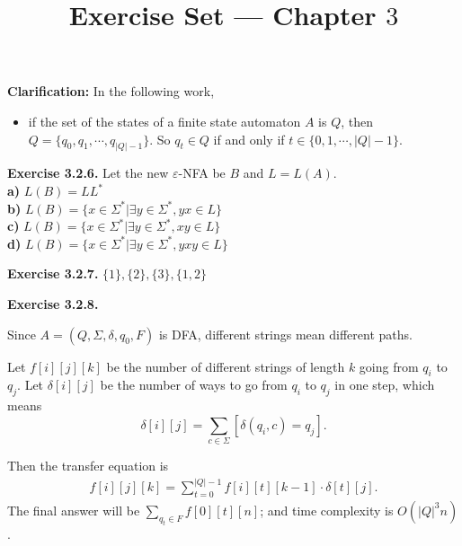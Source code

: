 \documentclass[a4paper]{article}
\title{Exercise Set --- Chapter $3$}
\date{}
\newenvironment{exercise}[1]{
	\par
	\noindent\textbf{Exercise #1.}\quad
}{
	\par
	\bigskip
}
\begin{document}
\maketitle

\noindent\textbf{Clarification:} In the following work,
\begin{itemize}
\item if the set of the states of a finite state automaton $A$ is $Q$,
then $Q=\{q_0,q_1,\cdots,q_{|Q|-1}\}$. So $q_t\in Q$ if and only if $t\in\{0,1,\cdots,|Q|-1\}$.
\end{itemize}

\begin{exercise}{3.2.6} Let the new $\varepsilon$-NFA be $B$ and $L=L(A)$.\\
    \textbf{a)} $L(B)=LL^*$\\
    \textbf{b)} $L(B)=\{x\in\Sigma^*|\exists y\in\Sigma^*, yx\in L\}$\\
    \textbf{c)} $L(B)=\{x\in\Sigma^*|\exists y\in\Sigma^*, xy\in L\}$\\
    \textbf{d)} $L(B)=\{x\in\Sigma^*|\exists y\in\Sigma^*, yxy\in L\}$
\end{exercise}

\begin{exercise}{3.2.7} $\{1\},\{2\},\{3\},\{1,2\}$\end{exercise}

\begin{exercise}{3.2.8}
    Since $A=(Q,\Sigma,\delta,q_0,F)$ is DFA,
    different strings mean different paths.\par
    Let $f[i][j][k]$ be the number of different strings of length $k$ going from $q_i$
    to $q_j$. Let $\delta[i][j]$ be the number of ways to go from $q_i$ to $q_j$ in one step, which means 
    $$
    \delta[i][j]=\sum_{c\in\Sigma} [\delta(q_i,c)=q_j].
    $$\par
    Then the transfer equation is
    \begin{gather*}
        f[i][j][k]=\sum_{t=0}^{|Q|-1} f[i][t][k-1]\cdot\delta[t][j].
    \end{gather*}
    The final answer will be $\sum_{q_t\in F} f[0][t][n]$; and 
    time complexity is $O(|Q|^3n)$.
\end{exercise}
\end{document}
